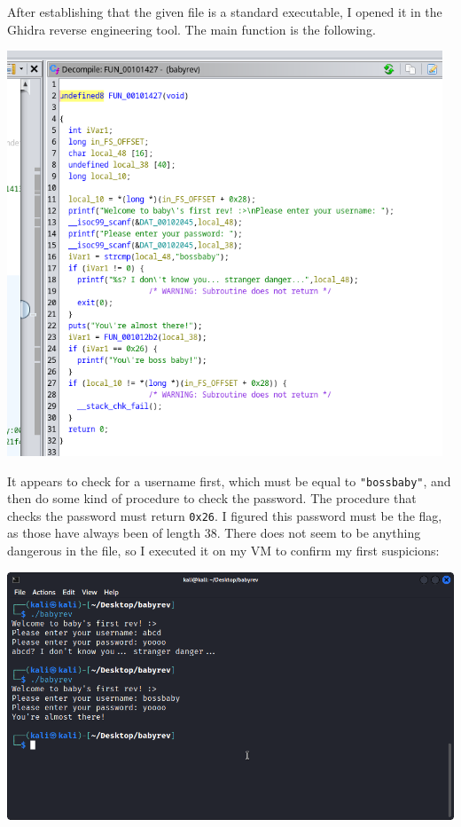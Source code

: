 \documentclass{article}
\begin{document}
After establishing that the given file is a standard executable, I opened it in the Ghidra reverse engineering tool. The main function is the following.

\noindent 
\begin{center}
\includegraphics[width=13cm]{babyrev/screenshot1.png}
\end{center}

\noindent
It appears to check for a username first, which must be equal to \texttt{"bossbaby"}, and then do some kind of procedure to check the password. The procedure that checks the password must return \texttt{0x26}. I figured this password must be the flag, as those have always been of length 38. There does not seem to be anything dangerous in the file, so I executed it on my VM to confirm my first suspicions: 

\noindent 
\begin{center}
\includegraphics[width=16cm]{babyrev/screenshot2.png}
\end{center}
\end{document}

